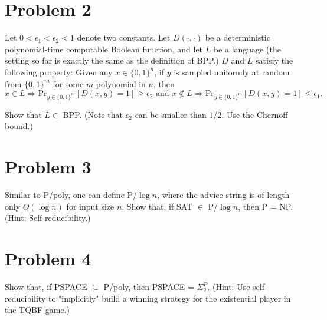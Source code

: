 \documentclass[twoside,11pt]{homework}
\begin{document}
\section*{Problem 2}
\begin{prob}
  Let $0 < \epsilon_1 < \epsilon_2 < 1$ denote two constants. Let $D(\cdot, \cdot)$ be a deterministic
  polynomial-time computable Boolean function, and let $L$ be a language (the
  setting so far is exactly the same as the definition of BPP.)
  $D$ and $L$ satisfy the following property:
  Given any $x \in \{0, 1\}^n$, if $y$ is sampled uniformly at random from $\{ 0,1
  \}^m$ for some $m$ polynomial in $n$, then
  \[
    x \in L \Rightarrow \text{Pr}_{y \in \{0,1\}^m}[D(x,y) = 1] \ge \epsilon_2
    \text{ and }
    x \notin L \Rightarrow \text{Pr}_{y \in \{0,1\}^m}[D(x,y) = 1] \le \epsilon_1.
  \]

  Show that $L \in$ BPP.
  (Note that $\epsilon_2$ can be smaller than $1/2$.
   Use the Chernoff bound.)
\end{prob}

\section*{Problem 3}

\begin{prob}
  Similar to P/poly, one can define P/$\log n$, where the advice string is of
  length only $O(\log n)$ for input size $n$.
  Show that, if SAT $\in$ P/$\log n$, then P = NP.
  (Hint: Self-reducibility.)
\end{prob}

\section*{Problem 4}

\begin{prob}
  Show that, if PSPACE $\subseteq$ P/poly, then PSPACE = $\Sigma_2^P$.
  (Hint: Use self-reducibility to "implicitly" build a winning strategy for the
  existential player in the TQBF game.)
\end{prob}
\end{document}
